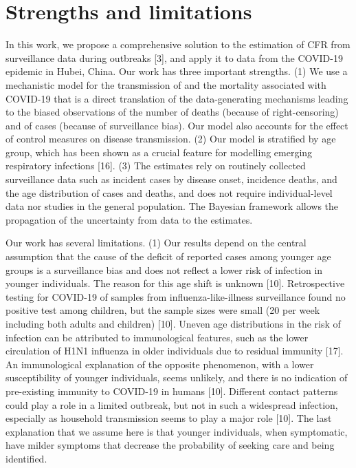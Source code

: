 \documentclass{article}
\begin{document}
\section*{Strengths and limitations}

In this work, we propose a comprehensive solution to the estimation of CFR from surveillance data during outbreaks [3], and apply it to data from the COVID-19 epidemic in Hubei, China. Our work has three important strengths. (1) We use a mechanistic model for the transmission of and the mortality associated with COVID-19 that is a direct translation of the data-generating mechanisms leading to the biased observations of the number of deaths (because of right-censoring) and of cases (because of surveillance bias). Our model also accounts for the effect of control measures on disease transmission. (2) Our model is stratified by age group, which has been shown as a crucial feature for modelling emerging respiratory infections [16]. (3) The estimates rely on routinely collected surveillance data such as incident cases by disease onset, incidence deaths, and the age distribution of cases and deaths, and does not require individual-level data nor studies in the general population. The Bayesian framework allows the propagation of the uncertainty from data to the estimates.

Our work has several limitations. (1) Our results depend on the central assumption that the cause of the deficit of reported cases among younger age groups is a surveillance bias and does not reflect a lower risk of infection in younger individuals. The reason for this age shift is unknown [10]. Retrospective testing for COVID-19 of samples from influenza-like-illness surveillance found no positive test among children, but the sample sizes were small (20 per week including both adults and children) [10]. Uneven age distributions in the risk of infection can be attributed to immunological features, such as the lower circulation of H1N1 influenza in older individuals due to residual immunity [17]. An immunological explanation of the opposite phenomenon, with a lower susceptibility of younger individuals, seems unlikely, and there is no indication of pre-existing immunity to COVID-19 in humans [10]. Different contact patterns could play a role in a limited outbreak, but not in such a widespread infection, especially as household transmission seems to play a major role [10]. The last explanation that we assume here is that younger individuals, when symptomatic, have milder symptoms that decrease the probability of seeking care and being identified. 
\end{document}
